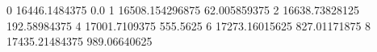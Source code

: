 0 16446.1484375 0.0
1 16508.154296875 62.005859375
2 16638.73828125 192.58984375
4 17001.7109375 555.5625
6 17273.16015625 827.01171875
8 17435.21484375 989.06640625
